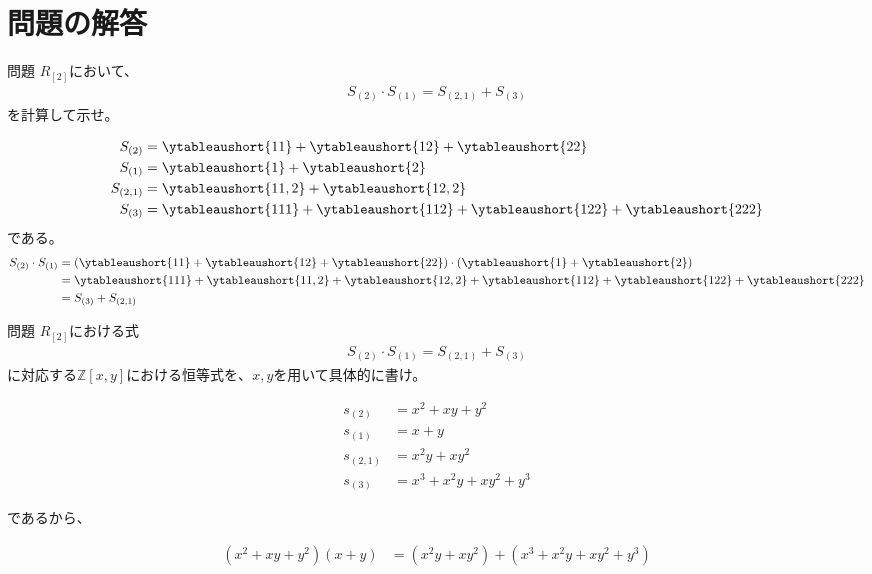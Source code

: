 \documentclass[a4paper,11pt]{jsarticle}
\theoremstyle{plain}
\theoremstyle{definition}
\renewcommand{\(}{\left(}
\renewcommand{\)}{\right)}
\renewcommand{\[}{\left[}
\renewcommand{\]}{\right]}
\renewcommand{\{}{\left\lbrace}
\renewcommand{\}}{\right\rbrace}
\newcommand{\Z}{\mathbb{Z}}
\begin{document}
\newpage
\section{問題の解答}

\begin{itembox}[l]{問題}
    $R_{[2]}$において、
    \begin{align*}
        S_{(2)} \cdot S_{(1)} = S_{(2,1)} + S_{(3)}
    \end{align*}
    を計算して示せ。
\end{itembox}

\begin{align*}
    S_{(2)} &= \ytableaushort{11} + \ytableaushort{12} + \ytableaushort{22} \\
    S_{(1)} &= \ytableaushort{1} + \ytableaushort{2} \\
    S_{(2,1)} &= \ytableaushort{11,2} + \ytableaushort{12,2} \\
    S_{(3)} &= \ytableaushort{111} + \ytableaushort{112} + \ytableaushort{122} + \ytableaushort{222}
\end{align*}
である。
\begin{align*}
    S_{(2)} \cdot S_{(1)} &= \(\ytableaushort{11} + \ytableaushort{12} + \ytableaushort{22}\) \cdot \(\ytableaushort{1} + \ytableaushort{2}\) \\
    &= \ytableaushort{111} + \ytableaushort{11,2} + \ytableaushort{12,2} + \ytableaushort{112} + \ytableaushort{122} + \ytableaushort{222} \\
    &= S_{(3)} + S_{(2,1)}
\end{align*}

\begin{itembox}[l]{問題}
    $R_{[2]}$における式
    \begin{align*}
        S_{(2)} \cdot S_{(1)} = S_{(2,1)} + S_{(3)}
    \end{align*}
    に対応する$\Z[x,y]$における恒等式を、$x,y$を用いて具体的に書け。
\end{itembox}

\begin{align*}
    s_{(2)} &= x^2 + xy + y^2 \\
    s_{(1)} &= x + y \\
    s_{(2,1)} &= x^2y + xy^2 \\
    s_{(3)} &= x^3 + x^2y + xy^2 + y^3
\end{align*}

であるから、

\begin{align*}
    (x^2 + xy + y^2)(x+y) &= (x^2y + xy^2) + (x^3 + x^2y + xy^2 + y^3) \\
\end{align*}
\end{document}
